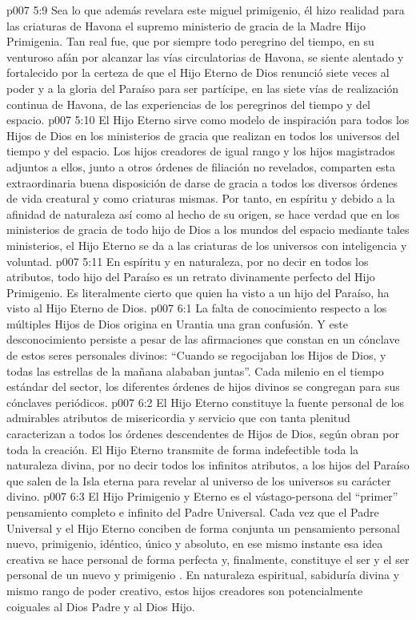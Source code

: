 \vs p007 5:9 Sea lo que además revelara este miguel primigenio, él hizo realidad para las criaturas de Havona el supremo ministerio de gracia de la Madre Hijo Primigenia. Tan real fue, que por siempre todo peregrino del tiempo, en su venturoso afán por alcanzar las vías circulatorias de Havona, se siente alentado y fortalecido por la certeza de que el Hijo Eterno de Dios renunció siete veces al poder y a la gloria del Paraíso para ser partícipe, en las siete vías de realización continua de Havona, de las experiencias de los peregrinos del tiempo y del espacio.
\vs p007 5:10 \pc El Hijo Eterno sirve como modelo de inspiración para todos los Hijos de Dios en los ministerios de gracia que realizan en todos los universos del tiempo y del espacio. Los hijos creadores de igual rango y los hijos magistrados adjuntos a ellos, junto a otros órdenes de filiación no revelados, comparten esta extraordinaria buena disposición de darse de gracia a todos los diversos órdenes de vida creatural y como criaturas mismas. Por tanto, en espíritu y debido a la afinidad de naturaleza así como al hecho de su origen, se hace verdad que en los ministerios de gracia de todo hijo de Dios a los mundos del espacio mediante tales ministerios, el Hijo Eterno se da a las criaturas de los universos con inteligencia y voluntad.
\vs p007 5:11 En espíritu y en naturaleza, por no decir en todos los atributos, todo hijo del Paraíso es un retrato divinamente perfecto del Hijo Primigenio. Es literalmente cierto que quien ha visto a un hijo del Paraíso, ha visto al Hijo Eterno de Dios.
\vs p007 6:1 La falta de conocimiento respecto a los múltiples Hijos de Dios origina en Urantia una gran confusión. Y este desconocimiento persiste a pesar de las afirmaciones que constan en un cónclave de estos seres personales divinos: “Cuando se regocijaban los Hijos de Dios, y todas las estrellas de la mañana alababan juntas”. Cada milenio en el tiempo estándar del sector, los diferentes órdenes de hijos divinos se congregan para sus cónclaves periódicos.
\vs p007 6:2 El Hijo Eterno constituye la fuente personal de los admirables atributos de misericordia y servicio que con tanta plenitud caracterizan a todos los órdenes descendentes de Hijos de Dios, según obran por toda la creación. El Hijo Eterno transmite de forma indefectible toda la naturaleza divina, por no decir todos los infinitos atributos, a los hijos del Paraíso que salen de la Isla eterna para revelar al universo de los universos su carácter divino.
\vs p007 6:3 \pc El Hijo Primigenio y Eterno es el vástago\hyp{}persona del “primer” pensamiento completo e infinito del Padre Universal. Cada vez que el Padre Universal y el Hijo Eterno conciben de forma conjunta un pensamiento personal nuevo, primigenio, idéntico, único y absoluto, en ese mismo instante esa idea creativa se hace personal de forma perfecta y, finalmente, constituye el ser y el ser personal de un nuevo y primigenio . En naturaleza espiritual, sabiduría divina y mismo rango de poder creativo, estos hijos creadores son potencialmente coiguales al Dios Padre y al Dios Hijo.

